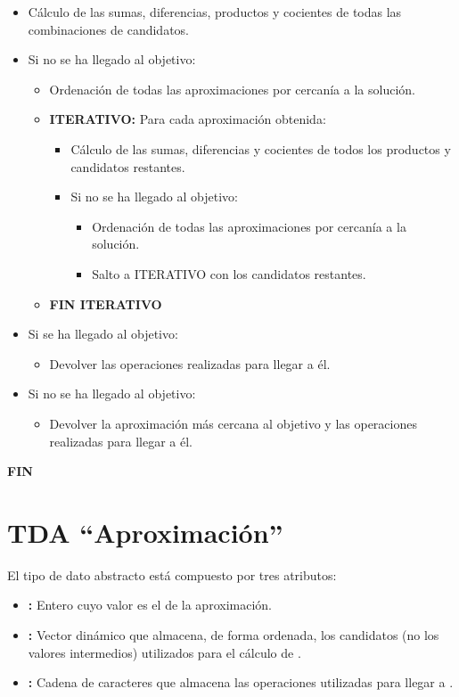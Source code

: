 \begin{itemize}
\item Cálculo de las sumas, diferencias, productos y cocientes de todas las combinaciones de candidatos.
\item Si no se ha llegado al objetivo:
	\begin{itemize}
	\item Ordenación de todas las aproximaciones por cercanía a la solución.
	\item\textbf{ITERATIVO:} Para cada aproximación obtenida:
		\begin{itemize}
		\item Cálculo de las sumas, diferencias y cocientes de todos los productos y candidatos restantes.
		\item Si no se ha llegado al objetivo:
			\begin{itemize}
			\item Ordenación de todas las aproximaciones por cercanía a la solución.
			\item Salto a ITERATIVO con los candidatos restantes.
			\end{itemize}
		\end{itemize}
	\item\textbf{FIN ITERATIVO}
	\end{itemize}
\item Si se ha llegado al objetivo:
	\begin{itemize}
	\item Devolver las operaciones realizadas para llegar a él.
	\end{itemize}
\item Si no se ha llegado al objetivo:
	\begin{itemize}
	\item Devolver la aproximación más cercana al objetivo y las operaciones realizadas para llegar a él.
	\end{itemize}
\end{itemize}

\textbf{FIN}

\pagebreak

\section{TDA ``Aproximación''}

El tipo de dato abstracto  está compuesto por tres atributos:

\begin{itemize}
\item{}\textbf{:} Entero cuyo valor es el de la aproximación.
\item{}\textbf{:} Vector dinámico que almacena, de forma ordenada, los candidatos (no los valores intermedios) utilizados para el cálculo de .
\item{}\textbf{:} Cadena de caracteres que almacena las operaciones utilizadas para llegar a .
\end{itemize}

